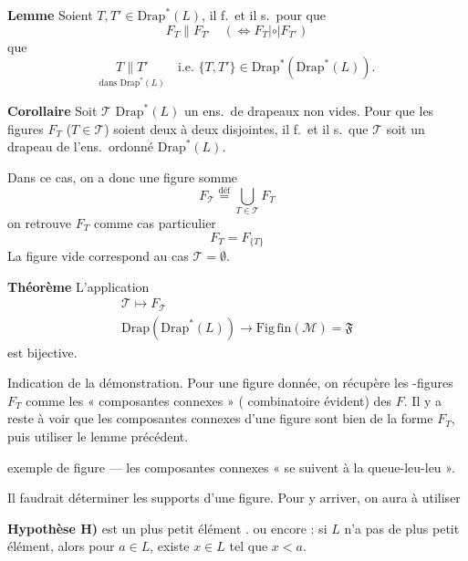 \documentclass[11pt,a4paper]{article}
\begin{document}
\textbf{Lemme} Soient $T, T'\in\mathrm{Drap}^*(L)$, il f.\ et il s.\ pour que
\[
F_T \parallel F_{T'} \quad (\Longleftrightarrow F_T \mathrel{|{\circ}|} F_{T'})
\]
que
\[
\underset{\text{dans } \mathrm{Drap}^*(L)}{T\parallel T'} \quad \text{i.e. } \{T,T'\}\in\mathrm{Drap}^*(\mathrm{Drap}^*(L)) .
\]



\textbf{Corollaire} Soit $\mathcal{T}$ \struck{$\subset$} $\mathrm{Drap}^*(L)$ un ens.\ de drapeaux non vides. Pour que les figures $F_T$ ($T\in\mathcal{T}$) soient deux à deux disjointes, il f.\ et il s.\ que $\mathcal{T}$ soit un drapeau de l'ens.\ ordonné $\mathrm{Drap}^*(L)$.

Dans ce cas, on a donc une figure somme
\[
F_{\mathcal{T}} \overset{\text{déf}}{=} \bigcup_{T\in\mathcal{T}} F_T
\]
on retrouve $F_T$ comme cas particulier
\[
F_T = F_{\{T\}}
\]
La figure vide correspond au cas $\mathcal{T} = \emptyset$.

\textbf{Théorème} L'application
\[
\begin{gathered}
\mathcal{T} \longmapsto F_{\mathcal{T}}\\
\mathrm{Drap}(\mathrm{Drap}^*(L)) \longrightarrow \mathrm{Fig\,fin}(\mathcal{M}) = \mathfrak{F}
\end{gathered}
\]
est bijective.

Indication de la démonstration.  Pour une figure donnée, on récupère les -figures $F_T$ comme les « composantes connexes » ( combinatoire évident) des $F$. Il y a reste à voir que les composantes connexes d'une figure sont bien de la forme $F_T$, puis utiliser le lemme précédent.



exemple de figure — les composantes connexes « se suivent à la queue-leu-leu ».

Il faudrait déterminer  \struck{\ill{}} les supports d'une figure. Pour y arriver, on aura à utiliser

\textbf{Hypothèse H)}   est un plus petit élément . \struck{\ill{}} ou encore :
 si $L$ n'a pas de plus petit élément, alors pour  $a\in L$, existe $x\in L$ tel que $x<a$.
\end{document}
